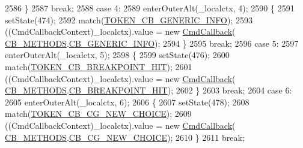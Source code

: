 \begin{DoxyCode}
2586         \}
2587         \textcolor{keywordflow}{break};
2588       \textcolor{keywordflow}{case} 4:
2589         enterOuterAlt(\_localctx, 4);
2590         \{
2591         setState(474);
2592         match(\hyperlink{classgov_1_1nasa_1_1jpf_1_1inspector_1_1client_1_1parser_1_1_console_grammar_parser_ac2864ce68a47e8fefc6f2e66e1f0af5e}{TOKEN\_CB\_GENERIC\_INFO});
2593          ((CmdCallbackContext)\_localctx).value =  \textcolor{keyword}{new} \hyperlink{classgov_1_1nasa_1_1jpf_1_1inspector_1_1client_1_1commands_1_1_cmd_callback}{CmdCallback}(
      \hyperlink{enumgov_1_1nasa_1_1jpf_1_1inspector_1_1interfaces_1_1_inspector_call_backs_1_1_c_b___m_e_t_h_o_d_s}{CB\_METHODS}.\hyperlink{enumgov_1_1nasa_1_1jpf_1_1inspector_1_1interfaces_1_1_inspector_call_backs_1_1_c_b___m_e_t_h_o_d_s_abd8b6b34cabf4d866742d72ba140f5df}{CB\_GENERIC\_INFO}); 
2594         \}
2595         \textcolor{keywordflow}{break};
2596       \textcolor{keywordflow}{case} 5:
2597         enterOuterAlt(\_localctx, 5);
2598         \{
2599         setState(476);
2600         match(\hyperlink{classgov_1_1nasa_1_1jpf_1_1inspector_1_1client_1_1parser_1_1_console_grammar_parser_a7e8632d59cca2eb259cbb68a977634ed}{TOKEN\_CB\_BREAKPOINT\_HIT});
2601          ((CmdCallbackContext)\_localctx).value =  \textcolor{keyword}{new} \hyperlink{classgov_1_1nasa_1_1jpf_1_1inspector_1_1client_1_1commands_1_1_cmd_callback}{CmdCallback}(
      \hyperlink{enumgov_1_1nasa_1_1jpf_1_1inspector_1_1interfaces_1_1_inspector_call_backs_1_1_c_b___m_e_t_h_o_d_s}{CB\_METHODS}.\hyperlink{enumgov_1_1nasa_1_1jpf_1_1inspector_1_1interfaces_1_1_inspector_call_backs_1_1_c_b___m_e_t_h_o_d_s_a7e99fa3c2f2ede89ef9223836fe06bbf}{CB\_BREAKPOINT\_HIT}); 
2602         \}
2603         \textcolor{keywordflow}{break};
2604       \textcolor{keywordflow}{case} 6:
2605         enterOuterAlt(\_localctx, 6);
2606         \{
2607         setState(478);
2608         match(\hyperlink{classgov_1_1nasa_1_1jpf_1_1inspector_1_1client_1_1parser_1_1_console_grammar_parser_a94b196d0e6cf1228268a2e715e79bad7}{TOKEN\_CB\_CG\_NEW\_CHOICE});
2609          ((CmdCallbackContext)\_localctx).value =  \textcolor{keyword}{new} \hyperlink{classgov_1_1nasa_1_1jpf_1_1inspector_1_1client_1_1commands_1_1_cmd_callback}{CmdCallback}(
      \hyperlink{enumgov_1_1nasa_1_1jpf_1_1inspector_1_1interfaces_1_1_inspector_call_backs_1_1_c_b___m_e_t_h_o_d_s}{CB\_METHODS}.\hyperlink{enumgov_1_1nasa_1_1jpf_1_1inspector_1_1interfaces_1_1_inspector_call_backs_1_1_c_b___m_e_t_h_o_d_s_a8a96693b7f439f0cefd0c31099c502cc}{CB\_CG\_NEW\_CHOICE}); 
2610         \}
2611         \textcolor{keywordflow}{break};

\end{DoxyCode}
